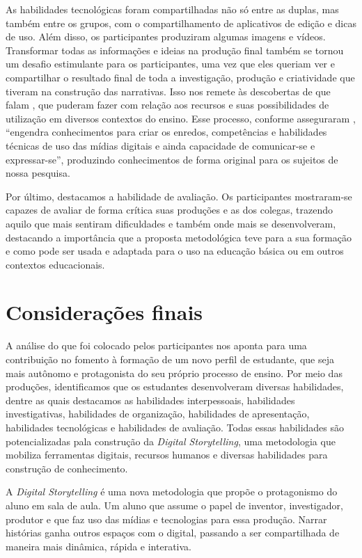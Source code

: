 \documentclass[portuguese]{textolivre}
\begin{document}
As habilidades tecnológicas foram compartilhadas não só entre as duplas, mas também entre os grupos, com o compartilhamento de aplicativos de edição e dicas de uso. Além disso, os participantes produziram algumas imagens e vídeos. Transformar todas as informações e ideias na produção final também se tornou um desafio estimulante para os participantes, uma vez que eles queriam ver e compartilhar o resultado final de toda a investigação, produção e criatividade que tiveram na construção das narrativas. Isso nos remete às descobertas de que falam \textcite{rodrigues2023para}, que puderam fazer com relação aos recursos e suas possibilidades de utilização em diversos contextos do ensino. Esse processo, conforme asseguraram \textcite[p.~339]{moura2023narrativa}, “engendra conhecimentos para criar os enredos, competências e habilidades técnicas de uso das mídias digitais e ainda capacidade de comunicar-se e expressar-se”, produzindo conhecimentos de forma original para os sujeitos de nossa pesquisa.

Por último, destacamos a habilidade de avaliação. Os participantes mostraram-se capazes de avaliar de forma crítica suas produções e as dos colegas, trazendo aquilo que mais sentiram dificuldades e também onde mais se desenvolveram, destacando a importância que a proposta metodológica teve para a sua formação e como pode ser usada e adaptada para o uso na educação básica ou em outros contextos educacionais.


\section{Considerações finais}\label{sec-formato}
A análise do que foi colocado pelos participantes nos aponta para uma contribuição no fomento à formação de um novo perfil de estudante, que seja mais autônomo e protagonista do seu próprio processo de ensino. Por meio das produções, identificamos que os estudantes desenvolveram diversas habilidades, dentre as quais destacamos as habilidades interpessoais, habilidades investigativas, habilidades de organização, habilidades de apresentação, habilidades tecnológicas e habilidades de avaliação. Todas essas habilidades são potencializadas pala construção da \textit{Digital Storytelling}, uma metodologia que mobiliza ferramentas digitais, recursos humanos e diversas habilidades para construção de conhecimento.

A \textit{Digital Storytelling} é uma nova metodologia que propõe o protagonismo do aluno em sala de aula. Um aluno que assume o papel de inventor, investigador, produtor e que faz uso das mídias e tecnologias para essa produção. Narrar histórias ganha outros espaços com o digital, passando a ser compartilhada de maneira mais dinâmica, rápida e interativa.
\end{document}
